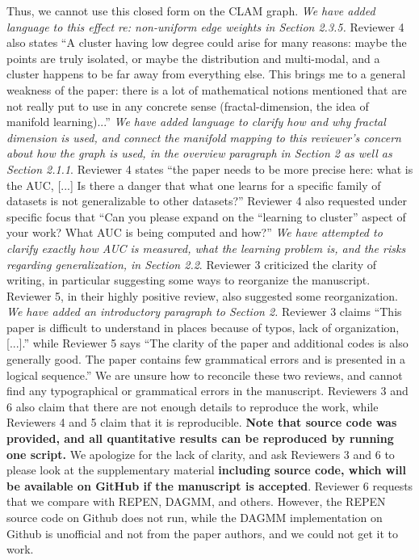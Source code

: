 \documentclass{article}
\begin{document}
Thus, we cannot use this closed form on the CLAM graph.
\emph{We have added language to this effect re: non-uniform edge weights in Section 2.3.5.}
Reviewer 4 also states ``A cluster having low degree could arise for many reasons: maybe the points are truly isolated, or maybe the distribution and multi-modal, and a cluster happens to be far away from everything else. 
This brings me to a general weakness of the paper: there is a lot of mathematical notions mentioned that are not really put to use in any concrete sense (fractal-dimension, the idea of manifold learning)...''
\emph{We have added language to clarify how and why fractal dimension is used, and connect the manifold mapping to this reviewer's concern about how the graph is used, in the overview paragraph in Section 2 as well as Section 2.1.1}.
Reviewer 4 states ``the paper needs to be more precise here: what is the AUC, [...] Is there a danger that what one learns for a specific family of datasets is not generalizable to other datasets?''
Reviewer 4 also requested under specific focus that ``Can you please expand on the ``learning to cluster'' aspect of your work? What AUC is being computed and how?''
\emph{We have attempted to clarify exactly how AUC is measured, what the learning problem is, and the risks regarding generalization, in Section 2.2}.
Reviewer 3 criticized the clarity of writing, in particular suggesting some ways to reorganize the manuscript.
Reviewer 5, in their highly positive review, also suggested some reorganization.
\emph{We have added an introductory paragraph to Section 2.}
Reviewer 3 claims ``This paper is difficult to understand in places because of typos, lack of organization, [...].'' while Reviewer 5 says ``The clarity of the paper and additional codes is also generally good. The paper contains few grammatical errors and is presented in a logical sequence.''
We are unsure how to reconcile these two reviews, and cannot find any typographical or grammatical errors in the manuscript.
Reviewers 3 and 6 also claim that there are not enough details to reproduce the work, while Reviewers 4 and 5 claim that it is reproducible.
\textbf{Note that source code was provided, and all quantitative results can be reproduced by running one script.}
We apologize for the lack of clarity, and ask Reviewers 3 and 6 to please look at the supplementary material \textbf{including source code, which will be available on GitHub if the manuscript is accepted}.
Reviewer 6 requests that we compare with REPEN, DAGMM, and others.
However, the REPEN source code on Github does not run, while the DAGMM implementation on Github is unofficial and not from the paper authors, and we could not get it to work.
\end{document}
